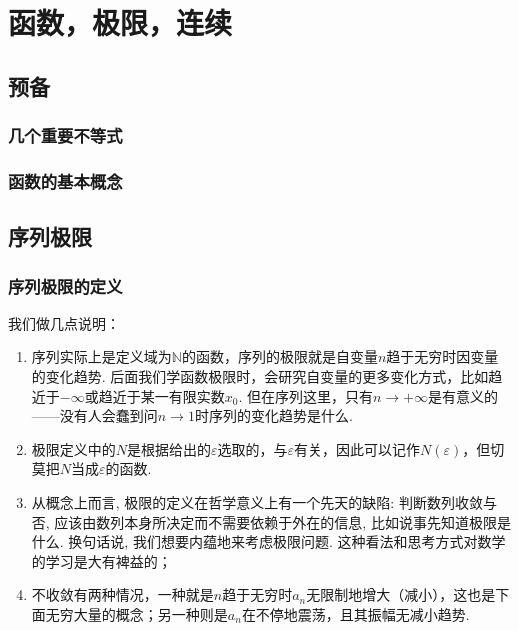 \documentclass[main]{subfiles}
\begin{document}
\chapter{函数，极限，连续}
\section{预备}
\subsection{几个重要不等式}
\subsection{函数的基本概念}
\section{序列极限}
\subsection{序列极限的定义}


我们做几点说明：
\begin{enumerate}
    \item 序列实际上是定义域为$\mathbb{N}$的函数，序列的极限就是自变量$n$趋于无穷时因变量的变化趋势. 后面我们学函数极限时，会研究自变量的更多变化方式，比如趋近于$-\infty$或趋近于某一有限实数$x_0$. 但在序列这里，只有$n\to+\infty$是有意义的——没有人会蠢到问$n\to1$时序列的变化趋势是什么.
    \item 极限定义中的$N$是根据给出的$\varepsilon$选取的，与$\varepsilon$有关，因此可以记作$N(\varepsilon)$，但切莫把$N$当成$\varepsilon$的函数.
    \item 从概念上而言, 极限的定义在哲学意义上有一个先天的缺陷: 判断数列收敛与否, 应该由数列本身所决定而不需要依赖于外在的信息, 比如说事先知道极限是什么. 换句话说, 我们想要内蕴地来考虑极限问题. 这种看法和思考方式对数学的学习是大有裨益的；
    \item 不收敛有两种情况，一种就是$n$趋于无穷时$a_n$无限制地增大（减小），这也是下面无穷大量的概念；另一种则是$a_n$在不停地震荡，且其振幅无减小趋势.
\end{enumerate}

\end{document}
